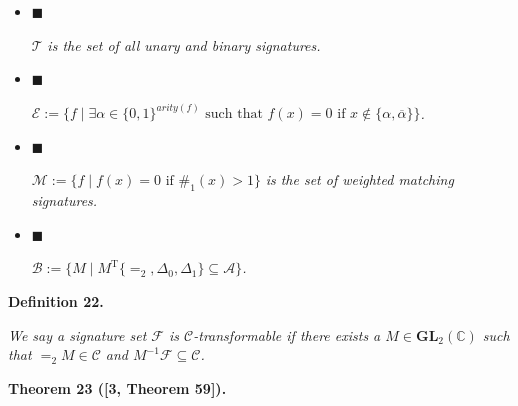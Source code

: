\begin{itemize}


\item[] 
$\blacksquare$ 


$\mathcal{T}$\emph{ is the set of all unary and binary signatures.}\par





\item[] 
$\blacksquare$ 


$\mathcal{E}:=\{f\mid\exists\alpha\in\{0,1\}^{arity(f)}\text{ such that }f(x)=0\text{ if }x\notin\{\alpha,\overline{\alpha}\}\}$\emph{.}\par





\item[] 
$\blacksquare$ 


$\mathcal{M}:=\{f\mid f(x)=0\text{ if }\#_{1}(x)>1\}$\emph{ is the set of weighted matching signatures.}\par





\item[] 
$\blacksquare$ 


$\mathcal{B}:=\{M\mid M^{\mathrm{T}}\{=_{2},\Delta_{0},\Delta_{1}\}\subseteq\mathscr{A}\}$\emph{.}\par





\end{itemize}







\par\medskip\noindent\textbf{
\textbf{Definition 22}\textbf{.}
}\par



\emph{We say a signature set $\mathcal{F}$ is $\mathscr{C}$-transformable if there exists a $M\in\textbf{GL}_{2}(\mathbb{C})$ such that $=_{2}M\in\mathscr{C}$ and $M^{-1}\mathcal{F}\subseteq\mathscr{C}$.}\par







\par\medskip\noindent\textbf{
\textbf{Theorem 23}\textbf{ }([3, Theorem 59])\textbf{.}
}\par




